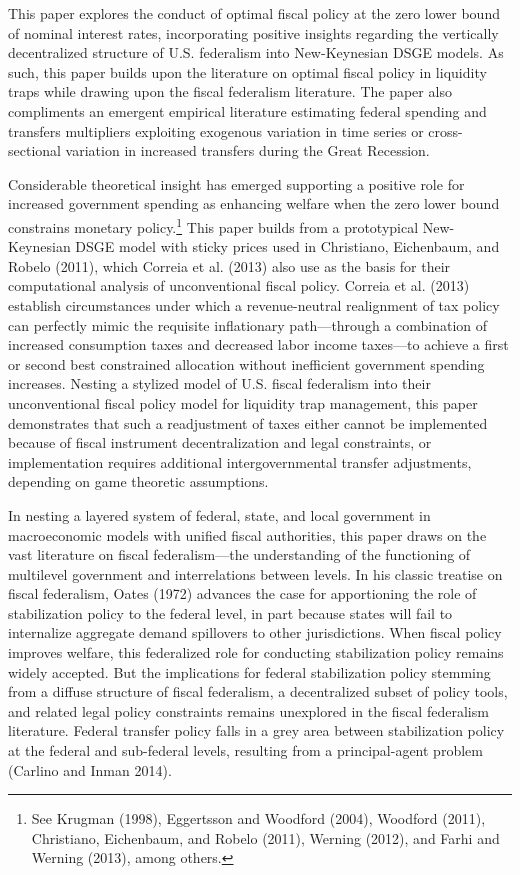 \documentclass[12pt,letterpaper]{article}
\begin{document}
This paper explores the conduct of optimal fiscal policy at the zero lower bound of nominal interest rates,  incorporating positive insights regarding the vertically decentralized structure of U.S. federalism into New-Keynesian DSGE models. As such, this paper builds upon the literature on optimal fiscal policy in liquidity traps while drawing upon the fiscal federalism literature. The paper also compliments an emergent empirical literature estimating federal spending and transfers multipliers exploiting exogenous variation in time series or cross-sectional variation in increased transfers during the Great Recession.

Considerable theoretical insight has emerged supporting a positive role for increased government spending as enhancing welfare when the zero lower bound constrains monetary policy.\footnote{See Krugman (1998), Eggertsson and Woodford (2004), Woodford (2011), Christiano, Eichenbaum, and Robelo (2011), Werning (2012), and Farhi and Werning (2013), among others.} This paper builds from a prototypical New-Keynesian DSGE model with sticky prices used in Christiano, Eichenbaum, and Robelo (2011), which Correia et al. (2013) also use as the basis for their computational analysis of unconventional fiscal policy. Correia et al. (2013) establish circumstances under which a revenue-neutral realignment of tax policy can perfectly mimic the requisite inflationary path---through a combination of increased consumption taxes and decreased labor income taxes---to achieve a first or second best constrained allocation without inefficient government spending increases. Nesting a stylized model of U.S. fiscal federalism into their unconventional fiscal policy model for liquidity trap management, this paper  demonstrates that such a readjustment of taxes either cannot be implemented because of fiscal instrument decentralization and legal constraints, or implementation requires additional intergovernmental transfer adjustments, depending on game theoretic assumptions. 

In nesting a layered system of federal, state, and local government in macroeconomic models with unified fiscal authorities, this paper draws on the vast literature on fiscal federalism---the understanding of the functioning of multilevel government and interrelations between levels. In his classic treatise on fiscal federalism, Oates (1972) advances the case for apportioning the role of stabilization policy to the federal level, in part because states will fail to internalize aggregate demand spillovers to other jurisdictions. When fiscal policy improves welfare, this federalized role for conducting stabilization policy remains widely accepted. But the implications for federal stabilization policy stemming from a diffuse structure of fiscal federalism, a decentralized subset of policy tools, and related legal policy constraints remains unexplored in the fiscal federalism literature. Federal transfer policy falls in a grey area between stabilization policy at the federal and sub-federal levels, resulting from a principal-agent problem (Carlino and Inman 2014).
\end{document}

